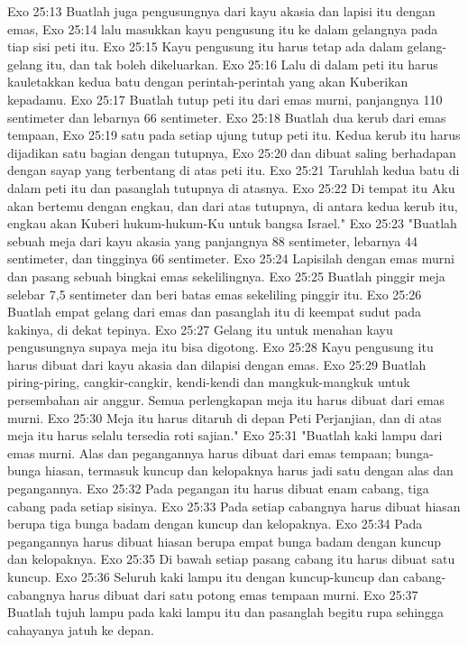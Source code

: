Exo 25:13  Buatlah juga pengusungnya dari kayu akasia dan lapisi itu dengan emas,
Exo 25:14  lalu masukkan kayu pengusung itu ke dalam gelangnya pada tiap sisi peti itu.
Exo 25:15  Kayu pengusung itu harus tetap ada dalam gelang-gelang itu, dan tak boleh dikeluarkan.
Exo 25:16  Lalu di dalam peti itu harus kauletakkan kedua batu dengan perintah-perintah yang akan Kuberikan kepadamu.
Exo 25:17  Buatlah tutup peti itu dari emas murni, panjangnya 110 sentimeter dan lebarnya 66 sentimeter.
Exo 25:18  Buatlah dua kerub dari emas tempaan,
Exo 25:19  satu pada setiap ujung tutup peti itu. Kedua kerub itu harus dijadikan satu bagian dengan tutupnya,
Exo 25:20  dan dibuat saling berhadapan dengan sayap yang terbentang di atas peti itu.
Exo 25:21  Taruhlah kedua batu di dalam peti itu dan pasanglah tutupnya di atasnya.
Exo 25:22  Di tempat itu Aku akan bertemu dengan engkau, dan dari atas tutupnya, di antara kedua kerub itu, engkau akan Kuberi hukum-hukum-Ku untuk bangsa Israel."
Exo 25:23  "Buatlah sebuah meja dari kayu akasia yang panjangnya 88 sentimeter, lebarnya 44 sentimeter, dan tingginya 66 sentimeter.
Exo 25:24  Lapisilah dengan emas murni dan pasang sebuah bingkai emas sekelilingnya.
Exo 25:25  Buatlah pinggir meja selebar 7,5 sentimeter dan beri batas emas sekeliling pinggir itu.
Exo 25:26  Buatlah empat gelang dari emas dan pasanglah itu di keempat sudut pada kakinya, di dekat tepinya.
Exo 25:27  Gelang itu untuk menahan kayu pengusungnya supaya meja itu bisa digotong.
Exo 25:28  Kayu pengusung itu harus dibuat dari kayu akasia dan dilapisi dengan emas.
Exo 25:29  Buatlah piring-piring, cangkir-cangkir, kendi-kendi dan mangkuk-mangkuk untuk persembahan air anggur. Semua perlengkapan meja itu harus dibuat dari emas murni.
Exo 25:30  Meja itu harus ditaruh di depan Peti Perjanjian, dan di atas meja itu harus selalu tersedia roti sajian."
Exo 25:31  "Buatlah kaki lampu dari emas murni. Alas dan pegangannya harus dibuat dari emas tempaan; bunga-bunga hiasan, termasuk kuncup dan kelopaknya harus jadi satu dengan alas dan pegangannya.
Exo 25:32  Pada pegangan itu harus dibuat enam cabang, tiga cabang pada setiap sisinya.
Exo 25:33  Pada setiap cabangnya harus dibuat hiasan berupa tiga bunga badam dengan kuncup dan kelopaknya.
Exo 25:34  Pada pegangannya harus dibuat hiasan berupa empat bunga badam dengan kuncup dan kelopaknya.
Exo 25:35  Di bawah setiap pasang cabang itu harus dibuat satu kuncup.
Exo 25:36  Seluruh kaki lampu itu dengan kuncup-kuncup dan cabang-cabangnya harus dibuat dari satu potong emas tempaan murni.
Exo 25:37  Buatlah tujuh lampu pada kaki lampu itu dan pasanglah begitu rupa sehingga cahayanya jatuh ke depan.
